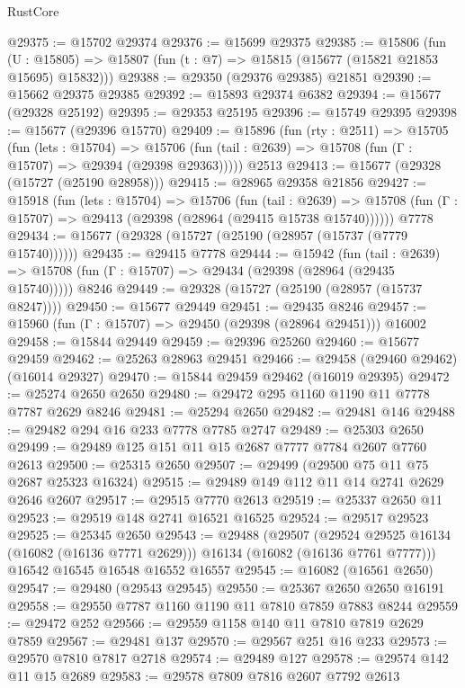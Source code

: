 \begin{lexlean}{RustCore}
\begin{coremodule}
@29375 := @15702 @29374
@29376 := @15699 @29375
@29385 := @15806
    (fun (U : @15805) => @15807 (fun (t : @7) => @15815 (@15677 (@15821 @21853 @15695) @15832)))
@29388 := @29350 (@29376 @29385) @21851
@29390 := @15662 @29375 @29385
@29392 := @15893 @29374 @6382
@29394 := @15677 (@29328 @25192)
@29395 := @29353 @25195
@29396 := @15749 @29395
@29398 := @15677 (@29396 @15770)
@29409 := @15896
    (fun (rty : @2511) =>
    @15705
      (fun (lets : @15704) =>
      @15706 (fun (tail : @2639) => @15708 (fun (Γ : @15707) => @29394 (@29398 @29363)))))
    @2513
@29413 := @15677 (@29328 (@15727 (@25190 @28958)))
@29415 := @28965 @29358 @21856
@29427 := @15918
    (fun (lets : @15704) =>
    @15706
      (fun (tail : @2639) =>
      @15708 (fun (Γ : @15707) => @29413 (@29398 (@28964 (@29415 @15738 @15740))))))
    @7778
@29434 := @15677 (@29328 (@15727 (@25190 (@28957 (@15737 (@7779 @15740))))))
@29435 := @29415 @7778
@29444 := @15942
    (fun (tail : @2639) => @15708 (fun (Γ : @15707) => @29434 (@29398 (@28964 (@29435 @15740)))))
    @8246
@29449 := @29328 (@15727 (@25190 (@28957 (@15737 @8247))))
@29450 := @15677 @29449
@29451 := @29435 @8246
@29457 := @15960 (fun (Γ : @15707) => @29450 (@29398 (@28964 @29451))) @16002
@29458 := @15844 @29449
@29459 := @29396 @25260
@29460 := @15677 @29459
@29462 := @25263 @28963 @29451
@29466 := @29458 (@29460 @29462) (@16014 @29327)
@29470 := @15844 @29459 @29462 (@16019 @29395)
@29472 := @25274 @2650 @2650
@29480 := @29472 @295 @1160 @1190 @11 @7778 @7787 @2629 @8246
@29481 := @25294 @2650
@29482 := @29481 @146
@29488 := @29482 @294 @16 @233 @7778 @7785 @2747
@29489 := @25303 @2650
@29499 := @29489 @125 @151 @11 @15 @2687 @7777 @7784 @2607 @7760 @2613
@29500 := @25315 @2650
@29507 := @29499 (@29500 @75 @11 @75 @2687 @25323 @16324)
@29515 := @29489 @149 @112 @11 @14 @2741 @2629 @2646 @2607
@29517 := @29515 @7770 @2613
@29519 := @25337 @2650 @11
@29523 := @29519 @148 @2741 @16521 @16525
@29524 := @29517 @29523
@29525 := @25345 @2650
@29543 := @29488
    (@29507
      (@29524 @29525 @16134 (@16082 (@16136 @7771 @2629)))
      @16134
      (@16082 (@16136 @7761 @7777)))
    @16542
    @16545
    @16548
    @16552
    @16557
@29545 := @16082 (@16561 @2650)
@29547 := @29480 (@29543 @29545)
@29550 := @25367 @2650 @2650 @16191
@29558 := @29550 @7787 @1160 @1190 @11 @7810 @7859 @7883 @8244
@29559 := @29472 @252
@29566 := @29559 @1158 @140 @11 @7810 @7819 @2629 @7859
@29567 := @29481 @137
@29570 := @29567 @251 @16 @233
@29573 := @29570 @7810 @7817 @2718
@29574 := @29489 @127
@29578 := @29574 @142 @11 @15 @2689
@29583 := @29578 @7809 @7816 @2607 @7792 @2613

\end{coremodule}
\end{lexlean}
